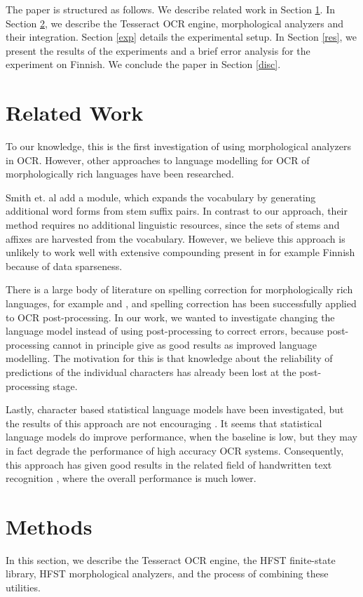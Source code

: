 \documentclass[b5paper]{article}
\begin{document}
The paper is structured as follows. We describe related work in
Section \ref{rel}. In Section \ref{met}, we describe the Tesseract OCR
engine, morphological analyzers and their integration. Section
\ref{exp} details the experimental setup. In Section \ref{res}, we
present the results of the experiments and a brief error analysis for
the experiment on Finnish. We conclude the paper in Section
\ref{disc}.

\section{Related Work}
\label{rel}
To our knowledge, this is the first investigation of using
morphological analyzers in OCR. However, other approaches to language
modelling for OCR of morphologically rich languages have been
researched.

Smith et. al \cite{smith09} add a module, which expands the vocabulary
by generating additional word forms from stem suffix pairs. In
contrast to our approach, their method requires no additional
linguistic resources, since the sets of stems and affixes are
harvested from the vocabulary. However, we believe this approach is
unlikely to work well with extensive compounding present in for
example Finnish because of data sparseness.

There is a large body of literature on spelling correction for
morphologically rich languages, for example \cite{oflazer94} and
\cite{pirinen12}, and spelling correction has been successfully
applied to OCR post-processing. In our work, we wanted to investigate
changing the language model instead of using post-processing to
correct errors, because post-processing cannot in principle give as
good results as improved language modelling. The motivation for this
is that knowledge about the reliability of predictions of the
individual characters has already been lost at the post-processing
stage.

Lastly, character based statistical language models have been
investigated, but the results of this approach are not encouraging
\cite{smith11}. It seems that statistical language models do improve
performance, when the baseline is low, but they may in fact degrade
the performance of high accuracy OCR systems. Consequently, this
approach has given good results in the related field of handwritten
text recognition \cite{marti01}, where the overall performance is much
lower.

\section{Methods}
\label{met} In this section, we describe the Tesseract OCR engine, the
HFST finite-state library, HFST morphological analyzers, and the
process of combining these utilities.
\end{document}
